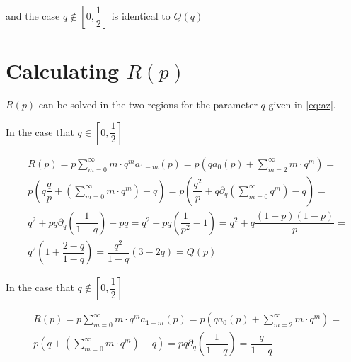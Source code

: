 \documentclass[letterpaper,12pt]{report}
\theoremstyle{plain}
\theoremstyle{definition}
\begin{document}
and the case $q\notin [0,\dfrac{1}{2}]$ is identical to $\mathit{Q}(q)$

\section{Calculating $\mathit{R}(p)$ } \label{app:calcrofp}  

$\mathit{R}(p)$  can be solved in the two regions for the parameter $q$ given in \ref{eq:az}.

In the case  that $q\in [0,\dfrac{1}{2}]$

\begin{eqnarray}\label{eq:rpcalc}\nonumber
&\mathit{R}(p)=p\sum_{m=0}^{\infty}m\cdot q^m\mathit{a}_{1-m}(p)=p\left(
q\mathit{a}_0(p)+\sum_{m=2}^{\infty}m\cdot q^m
 \right)=\\\nonumber
 &p\left(
q\dfrac{q}{p}+\left(\sum_{m=0}^{\infty}m\cdot q^m\right)-q
 \right) 
 =p\left(
\dfrac{q^2}{p}+q\partial_q\left(\sum_{m=0}^{\infty} q^m\right)-q
 \right)=\\\nonumber
& q^2+pq\partial_q\left(\dfrac{1}{1-q}\right)-pq 
 = q^2+pq\left(\dfrac{1}{p^2} -1\right) =q^2+q\dfrac{(1+p)(1-p)}{p}=
 \\\nonumber
& q^2\left(1+\dfrac{2-q}{1-q}\right)= \dfrac{q^2}{1-q}\left(
3-2q\right)=\mathit{Q}(p)
\end{eqnarray}


In the case  that $q\notin [0,\dfrac{1}{2}]$

\begin{eqnarray}\nonumber
&\mathit{R}(p)=p\sum_{m=0}^{\infty}m\cdot q^m\mathit{a}_{1-m}(p)=p\left(
q\mathit{a}_0(p)+\sum_{m=2}^{\infty}m\cdot q^m
 \right)=\\\nonumber
 & p\left(q+\left(\sum_{m=0}^{\infty}m\cdot q^m\right)-q \right) =pq\partial_q\left(\dfrac{1}{1-q}\right)=\dfrac{q}{1-q}
\end{eqnarray}


\newpage

\end{document}
